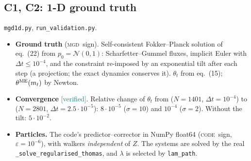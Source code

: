 \documentclass[11pt,a4paper]{article}
\newcommand{\code}[1]{\texttt{#1}}
\newcommand{\ver}{\textcolor{teal}{\textsf{[verified]}}}
\newcommand{\dt}{\Delta t}
\newcommand{\MGD}{\textsc{mgd}}
\newcommand{\cs}{\textsc{code}}
\begin{document}
\subsection{C1, C2: 1-D ground truth}
\code{mgd1d.py}, \code{run\_validation.py}.
\begin{itemize}
\item \textbf{Ground truth} (\MGD\ sign). Self-consistent Fokker--Planck solution of eq.~(22) from $p_0=\mathcal N(0,1)$: Scharfetter--Gummel fluxes, implicit Euler with $\dt\le10^{-4}$, and the
  constraint re-imposed by an exponential tilt after each step (a projection; the exact dynamics conserves it). $\theta_t$ from eq.~(15); $\theta^{\rm ME}(m_t)$ by Newton.
\item \textbf{Convergence} \ver. Relative change of $\theta_t$ from ($N=1401$, $\dt=10^{-4}$) to ($N=2801$, $\dt=2.5\cdot10^{-5}$): $8\cdot10^{-5}$ ($\sigma=10$) and
  $10^{-4}$ ($\sigma=2$). Without the tilt: $5\cdot10^{-2}$.
\item \textbf{Particles.} The code's predictor--corrector in NumPy float64 (\cs\ sign, $\varepsilon=10^{-6}$), with walkers \emph{independent} of $Z$. The
  systems are solved by the real \code{\_solve\_regularised\_thomas}, and $\lambda$ is selected by \code{lam\_path}.
\end{itemize}

\end{document}
